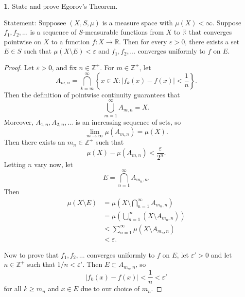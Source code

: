 \documentclass[12pt]{article}
\theoremstyle{definition}
\newtheorem{ex}{}
\newenvironment{exercise}[1]{
	\renewcommand{\theex}{#1}
	\begin{ex}
		}{\end{ex}}
\begin{document}
\begin{exercise}{1(b)}
	State and prove Egorov's Theorem.
\end{exercise}
Statement: Supposee $(X, S, \mu)$ is a measure space with $\mu(X) < \infty$.
Suppose $f_1, f_2, \dots$ is a sequence of $S$-measurable functions from $X$ to $\mathbb{R}$ that converges pointwise on $X$ to a function $f : X \to \mathbb{R}$.
Then for every $\varepsilon > 0$, there exists a set $E \in S$ such that $\mu(X \setminus E) < \varepsilon$ and $f_1, f_2, \dots$ converges uniformly to $f$ on $E$.
\begin{proof}
	Let $\varepsilon > 0$, and fix $n \in \mathbb{Z}^+$.
	For $m \in \mathbb{Z}^+$, let \begin{equation*}
		A_{m, n} = \bigcap_{k=m}^\infty \left\lbrace x \in X : |f_k(x) - f(x)| < \frac{1}{n} \right\rbrace.
	\end{equation*}
	Then the definition of pointwise continuity guarantees that \begin{equation*}
		\bigcup_{m=1}^\infty A_{m,n} = X.
	\end{equation*}
	Moreover, $A_{1, n}, A_{2, n}, \dots$ is an increasing sequence of sets, so \begin{equation*}
		\lim_{m \to \infty} \mu(A_{m,n}) = \mu(X).
	\end{equation*}
	Then there exists an $m_n \in \mathbb{Z}^+$ such that \begin{equation*}
		\mu(X) - \mu(A_{m,n}) < \frac{\varepsilon}{2^n}.
	\end{equation*}
	Letting $n$ vary now, let \begin{equation*}
		E = \bigcap_{n = 1}^\infty A_{m_n, n}.
	\end{equation*}
	Then \begin{align*}
		\mu(X \setminus E) & = \mu \left( X \setminus \bigcap_{n=1}^\infty A_{m_n, n} \right)   \\
		                   & = \mu \left( \bigcup_{n=1}^\infty (X \setminus A_{m_n, n}) \right) \\
		                   & \leq \sum_{n=1}^\infty \mu(X \setminus A_{m_n, n})                 \\
		                   & < \varepsilon.
	\end{align*}

  Now to prove that $f_1, f_2, \dots$ converges uniformly to $f$ on $E$, let $\varepsilon' > 0$ and let $n \in \mathbb{Z}^+$ such that $1/n < \varepsilon'$.
  Then $E \subset A_{m_n, n}$, so \begin{equation*}
    |f_k(x) - f(x)| < \frac{1}{n} < \varepsilon'
  \end{equation*}
  for all $k \geq m_n$ and $x \in E$ due to our choice of $m_n$.
\end{proof}
\end{document}
